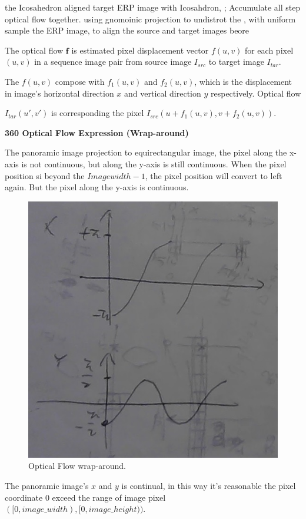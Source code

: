 
the Icosahedron  aligned target ERP image with Icosahdron, ;
Accumulate all step optical flow together.
using gnomoinic projection to undistrot the , with uniform sample the ERP image,
to align the source and target images beore

The optical flow $\textbf{f}$ is estimated pixel displacement vector $f(u,v)$ for each pixel $(u,v)$ in a sequence image pair from source image $I_{src}$ to target image $I_{tar}$.

The $f(u,v)$ compose with $f_1(u,v)$ and $f_2(u,v)$, which is the displacement in image's horizontal direction $x$ and vertical direction $y$ respectively.
Optical flow 

$I_{tar}(u',v')$ is corresponding the pixel $I_{src}(u + f_1(u,v), v + f_2(u,v))$.

\textbf{360 Optical Flow Expression (Wrap-around)}

The panoramic image projection to equirectangular image, the pixel along the x-axis is not continuous, but along the y-axis is still continuous. When the pixel position si beyond the  ${Imagewidth -1}$, the pixel position will convert to left again.
But the pixel along the y-axis is continuous.

\begin{figure}[hbt!]
	\centering
	\includegraphics[width=0.45\linewidth]{images/wrap-around-0.jpg}
	\caption{Optical Flow wrap-around.}
	\label{fig:app:warparound}
\end{figure}

The panoramic image's $x$ and $y$ is continual, in this way it's reasonable the pixel coordinate 0 exceed the range of image pixel $([0, image\_width), [0, image\_height))$. 

